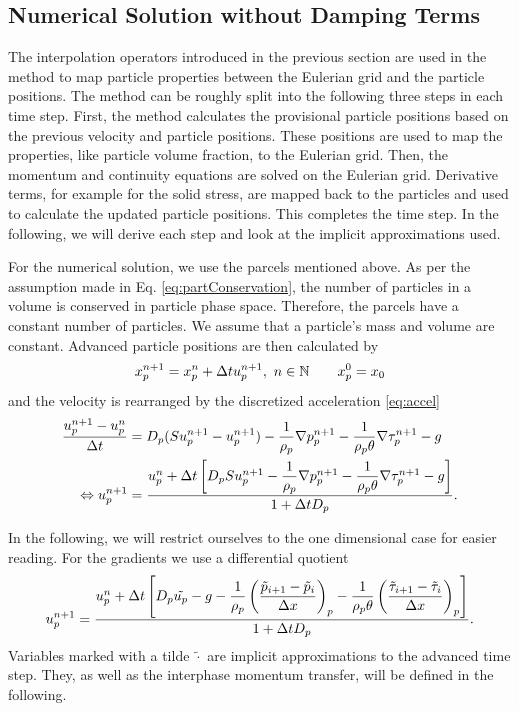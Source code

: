 \subsection{Numerical Solution without Damping Terms}
The interpolation operators introduced in the previous section are used in the \MP method to map particle properties between the Eulerian grid and the particle positions.
The method can be roughly split into the following three steps in each time step.
First, the method calculates the provisional particle positions based on the previous velocity and particle positions.
These positions are used to map the properties, like particle volume fraction, to the Eulerian grid.
Then, the momentum and continuity equations are solved on the Eulerian grid.
Derivative terms, for example for the solid stress, are mapped back to the particles and used to calculate the updated particle positions.
This completes the time step.
In the following, we will derive each step and look at the implicit approximations used.

For the numerical solution, we use the parcels mentioned above. As per the assumption made in Eq. \eqref{eq:partConservation}, the number of particles in a volume is conserved in particle phase space. 
Therefore, the parcels have a constant number of particles.
We assume that a particle's mass and volume are constant.
Advanced particle positions are then calculated by
\begin{equation}
    \label{eq:MPposition}
    x_p^{n+1} = x_p^{n} + \Delta t u_p^{n+1}, \ n \in \mathbb{N} \qquad x_p^{0} = x_0
\end{equation}
and the velocity is rearranged by the discretized acceleration \eqref{eq:accel}
\begin{align}
    \dfrac{u_p^{n+1} - u_p^{n}}{\Delta t} &= D_p (S u_p^{n+1} -
    u_p^{n+1})  - \dfrac{1}{\rho_p} \nabla p_p^{n+1} - \dfrac{1}{\rho_p \theta} \nabla \tau_p^{n+1} - g  \nonumber \\
    \Leftrightarrow u_p^{n+1} &= \dfrac{u_p^n + \Delta t \left[ D_p Su_p^{n+1} - \dfrac{1}{\rho_p} \nabla p_p^{n+1} - \dfrac{1}{\rho_p \theta} \nabla \tau_p^{n+1} - g \right]}{1 + \Delta t D_p} .\label{eq:errVel} 
\end{align}

In the following, we will restrict ourselves to the one dimensional case for easier reading. 
For the gradients we use a differential quotient 
\begin{equation}
\label{eq:MPvelocity}
    u_p^{n+1} = \dfrac{u_p^n + \Delta t \left[D_p \tilde{u_{p}} - g - \dfrac{1}{\rho_p} \left(\dfrac{\tilde{p}_{i+1} - \tilde{p}_i}{\Delta x} \right)_p - \dfrac{1}{\rho_p \theta} \left( \dfrac{\tilde{\tau}_{i+1} - \tilde{\tau}_i}{\Delta x}\right)_p \right]}{1 + \Delta t D_p}.
\end{equation}
Variables marked with a tilde $\tilde{\cdot}$ are implicit approximations to the advanced time step. They, as well as the interphase momentum transfer, will be defined in the following.

